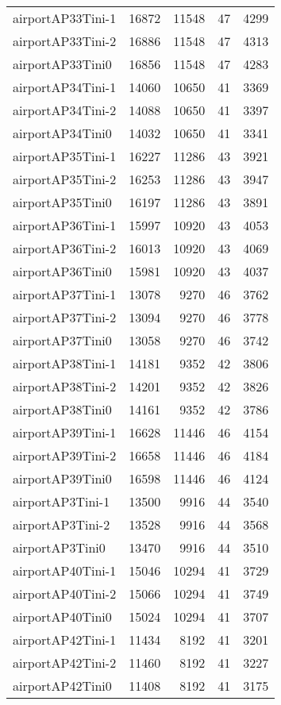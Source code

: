 \begin{tabular}{lrrrr}
airportAP33Tini-1 & 16872 & 11548 & 47 & 4299 \\
airportAP33Tini-2 & 16886 & 11548 & 47 & 4313 \\
airportAP33Tini0 & 16856 & 11548 & 47 & 4283 \\
airportAP34Tini-1 & 14060 & 10650 & 41 & 3369 \\
airportAP34Tini-2 & 14088 & 10650 & 41 & 3397 \\
airportAP34Tini0 & 14032 & 10650 & 41 & 3341 \\
airportAP35Tini-1 & 16227 & 11286 & 43 & 3921 \\
airportAP35Tini-2 & 16253 & 11286 & 43 & 3947 \\
airportAP35Tini0 & 16197 & 11286 & 43 & 3891 \\
airportAP36Tini-1 & 15997 & 10920 & 43 & 4053 \\
airportAP36Tini-2 & 16013 & 10920 & 43 & 4069 \\
airportAP36Tini0 & 15981 & 10920 & 43 & 4037 \\
airportAP37Tini-1 & 13078 & 9270 & 46 & 3762 \\
airportAP37Tini-2 & 13094 & 9270 & 46 & 3778 \\
airportAP37Tini0 & 13058 & 9270 & 46 & 3742 \\
airportAP38Tini-1 & 14181 & 9352 & 42 & 3806 \\
airportAP38Tini-2 & 14201 & 9352 & 42 & 3826 \\
airportAP38Tini0 & 14161 & 9352 & 42 & 3786 \\
airportAP39Tini-1 & 16628 & 11446 & 46 & 4154 \\
airportAP39Tini-2 & 16658 & 11446 & 46 & 4184 \\
airportAP39Tini0 & 16598 & 11446 & 46 & 4124 \\
airportAP3Tini-1 & 13500 & 9916 & 44 & 3540 \\
airportAP3Tini-2 & 13528 & 9916 & 44 & 3568 \\
airportAP3Tini0 & 13470 & 9916 & 44 & 3510 \\
airportAP40Tini-1 & 15046 & 10294 & 41 & 3729 \\
airportAP40Tini-2 & 15066 & 10294 & 41 & 3749 \\
airportAP40Tini0 & 15024 & 10294 & 41 & 3707 \\
airportAP42Tini-1 & 11434 & 8192 & 41 & 3201 \\
airportAP42Tini-2 & 11460 & 8192 & 41 & 3227 \\
airportAP42Tini0 & 11408 & 8192 & 41 & 3175 \\

\end{tabular}
